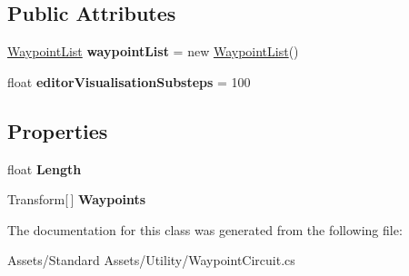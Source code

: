 \subsection*{Public Attributes}
\begin{DoxyCompactItemize}
\item 
\hyperlink{class_unity_standard_assets_1_1_utility_1_1_waypoint_circuit_1_1_waypoint_list}{Waypoint\+List} {\bfseries waypoint\+List} = new \hyperlink{class_unity_standard_assets_1_1_utility_1_1_waypoint_circuit_1_1_waypoint_list}{Waypoint\+List}()\hypertarget{class_unity_standard_assets_1_1_utility_1_1_waypoint_circuit_a7cef14c77ae5197606ba1aade971ed3d}{}\label{class_unity_standard_assets_1_1_utility_1_1_waypoint_circuit_a7cef14c77ae5197606ba1aade971ed3d}

\item 
float {\bfseries editor\+Visualisation\+Substeps} = 100\hypertarget{class_unity_standard_assets_1_1_utility_1_1_waypoint_circuit_a8d79a68fb7501d467e45990cd38c0de0}{}\label{class_unity_standard_assets_1_1_utility_1_1_waypoint_circuit_a8d79a68fb7501d467e45990cd38c0de0}

\end{DoxyCompactItemize}
\subsection*{Properties}
\begin{DoxyCompactItemize}
\item 
float {\bfseries Length}\hypertarget{class_unity_standard_assets_1_1_utility_1_1_waypoint_circuit_a0cb31df6885aa3bd8924ece61343c529}{}\label{class_unity_standard_assets_1_1_utility_1_1_waypoint_circuit_a0cb31df6885aa3bd8924ece61343c529}

\item 
Transform\mbox{[}$\,$\mbox{]} {\bfseries Waypoints}\hypertarget{class_unity_standard_assets_1_1_utility_1_1_waypoint_circuit_abdceee908c241b0568f6b7545c0f677a}{}\label{class_unity_standard_assets_1_1_utility_1_1_waypoint_circuit_abdceee908c241b0568f6b7545c0f677a}

\end{DoxyCompactItemize}


The documentation for this class was generated from the following file\+:\begin{DoxyCompactItemize}
\item 
Assets/\+Standard Assets/\+Utility/Waypoint\+Circuit.\+cs\end{DoxyCompactItemize}
